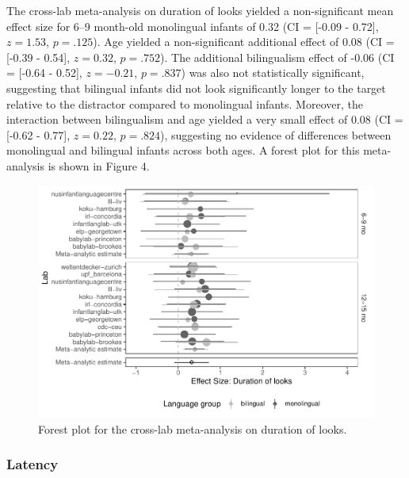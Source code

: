 \documentclass[,man,floatsintext]{apa6}
\begin{document}
The cross-lab meta-analysis on duration of looks yielded a non-significant mean effect size for 6--9 month-old monolingual infants of 0.32 (CI = {[}-0.09 - 0.72{]}, \(z = 1.53\), \(p = .125\)). Age yielded a non-significant additional effect of 0.08 (CI = {[}-0.39 - 0.54{]}, \(z = 0.32\), \(p = .752\)). The additional bilingualism effect of -0.06 (CI = {[}-0.64 - 0.52{]}, \(z = -0.21\), \(p = .837\)) was also not statistically significant, suggesting that bilingual infants did not look significantly longer to the target relative to the distractor compared to monolingual infants. Moreover, the interaction between bilingualism and age yielded a very small effect of 0.08 (CI = {[}-0.62 - 0.77{]}, \(z = 0.22\), \(p = .824\)), suggesting no evidence of differences between monolingual and bilingual infants across both ages. A forest plot for this meta-analysis is shown in Figure 4.

\begin{figure}
\centering
\includegraphics{gaze-following-paper_files/figure-latex/fig4-1.pdf}
\caption{\label{fig:fig4}Forest plot for the cross-lab meta-analysis on duration of looks.}
\end{figure}

\hypertarget{latency}{%
\subsubsection{Latency}\label{latency}}
\end{document}
